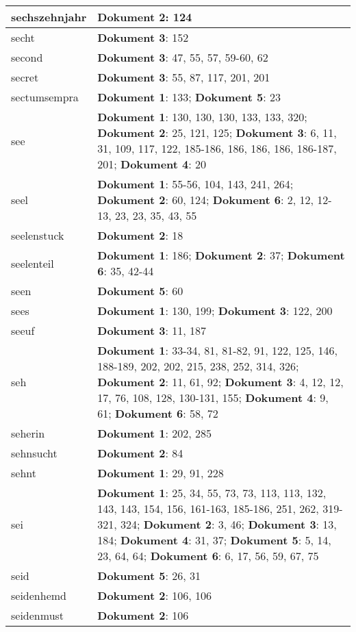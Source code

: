 \documentclass[a5paper]{article}
\begin{document}
\begin{longtable}[l]{|l|p{3in}|}
\hline
sechszehnjahr & \textbf{Dokument 2}: 124 \\
\hline
secht & \textbf{Dokument 3}: 152 \\
\hline
second & \textbf{Dokument 3}: 47, 55, 57, 59-60, 62 \\
\hline
secret & \textbf{Dokument 3}: 55, 87, 117, 201, 201 \\
\hline
sectumsempra & \textbf{Dokument 1}: 133; \textbf{Dokument 5}: 23 \\
\hline
see & \textbf{Dokument 1}: 130, 130, 130, 133, 133, 320; \textbf{Dokument 2}: 25, 121, 125; \textbf{Dokument 3}: 6, 11, 31, 109, 117, 122, 185-186, 186, 186, 186, 186-187, 201; \textbf{Dokument 4}: 20 \\
\hline
seel & \textbf{Dokument 1}: 55-56, 104, 143, 241, 264; \textbf{Dokument 2}: 60, 124; \textbf{Dokument 6}: 2, 12, 12-13, 23, 23, 35, 43, 55 \\
\hline
seelenstuck & \textbf{Dokument 2}: 18 \\
\hline
seelenteil & \textbf{Dokument 1}: 186; \textbf{Dokument 2}: 37; \textbf{Dokument 6}: 35, 42-44 \\
\hline
seen & \textbf{Dokument 5}: 60 \\
\hline
sees & \textbf{Dokument 1}: 130, 199; \textbf{Dokument 3}: 122, 200 \\
\hline
seeuf & \textbf{Dokument 3}: 11, 187 \\
\hline
seh & \textbf{Dokument 1}: 33-34, 81, 81-82, 91, 122, 125, 146, 188-189, 202, 202, 215, 238, 252, 314, 326; \textbf{Dokument 2}: 11, 61, 92; \textbf{Dokument 3}: 4, 12, 12, 17, 76, 108, 128, 130-131, 155; \textbf{Dokument 4}: 9, 61; \textbf{Dokument 6}: 58, 72 \\
\hline
seherin & \textbf{Dokument 1}: 202, 285 \\
\hline
sehnsucht & \textbf{Dokument 2}: 84 \\
\hline
sehnt & \textbf{Dokument 1}: 29, 91, 228 \\
\hline
sei & \textbf{Dokument 1}: 25, 34, 55, 73, 73, 113, 113, 132, 143, 143, 154, 156, 161-163, 185-186, 251, 262, 319-321, 324; \textbf{Dokument 2}: 3, 46; \textbf{Dokument 3}: 13, 184; \textbf{Dokument 4}: 31, 37; \textbf{Dokument 5}: 5, 14, 23, 64, 64; \textbf{Dokument 6}: 6, 17, 56, 59, 67, 75 \\
\hline
seid & \textbf{Dokument 5}: 26, 31 \\
\hline
seidenhemd & \textbf{Dokument 2}: 106, 106 \\
\hline
seidenmust & \textbf{Dokument 2}: 106 \\

\end{longtable}
\end{document}
